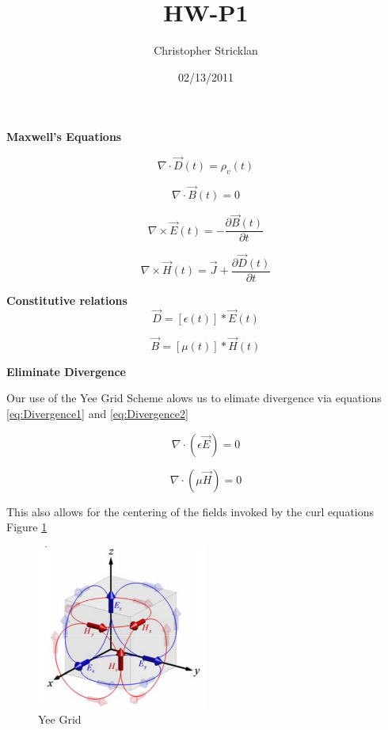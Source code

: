\documentclass[a4paper,10pt]{article}
\title{HW\pound3-P1}
\author{Christopher Stricklan}
\date{02/13/2011}
\begin{document}
\textbf{Maxwell's Equations}  

\begin{equation}
  \nabla \cdot \vec{D}(t)=\rho_{v}(t)
\end{equation}

\begin{equation}
  \nabla \cdot \vec{B}(t)=0
\end{equation}

\begin{equation}
  \nabla \times \vec{E}(t) = -\frac{\partial \vec{B}(t)}{\partial t}
\end{equation}

\begin{equation}
  \nabla \times \vec{H}(t) = \vec{J} + \frac{\partial\vec{D}(t)}{\partial t}
\end{equation}
                                                                                   

\textbf{Constitutive relations}
\begin{equation}
  \label{eq:constitutive1}
  \vec{D} = [\epsilon(t)]*\vec{E}(t)
\end{equation}

\begin{equation}
  \label{eq:constitutive2}
  \vec{B} = [\mu(t)]*\vec{H}(t)
\end{equation}


\textbf{Eliminate Divergence}

Our use of the Yee Grid Scheme alows us to elimate divergence via equations \eqref{eq:Divergence1} and \eqref{eq:Divergence2}

\begin{equation} 
  \label{eq:Divergence1}
  \nabla \cdot (\epsilon\vec{E}) = 0
\end{equation}

\begin{equation} 
  \label{eq:Divergence2}
  \nabla \cdot(\mu\vec{H}) = 0
\end{equation}

This also allows for the centering of the fields invoked by the curl equations Figure \ref{fig:YeeGridWithCurls}

\begin{figure}[h]
  \centering
    \includegraphics[width=0.5\textwidth]{YeeGrid.png}
  \caption{Yee Grid}
  \label{fig:YeeGridWithCurls}
\end{figure}
	
\end{document}
